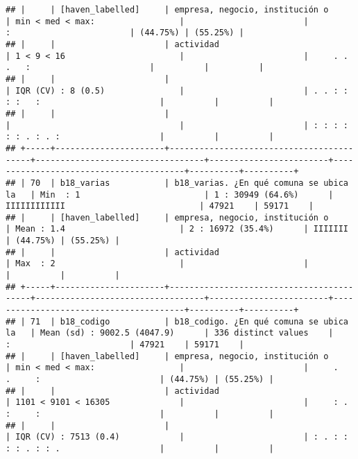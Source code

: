 \documentclass[]{article}
\begin{document}
\begin{verbatim}
## |     | [haven_labelled]     | empresa, negocio, institución o          | min < med < max:                 |                        |               :                        | (44.75%) | (55.25%) |
## |     |                      | actividad                                | 1 < 9 < 16                       |                        |     . .   .   :                        |          |          |
## |     |                      |                                          | IQR (CV) : 8 (0.5)               |                        | . . : : : :   :                        |          |          |
## |     |                      |                                          |                                  |                        | : : : : : : . : . :                    |          |          |
## +-----+----------------------+------------------------------------------+----------------------------------+------------------------+----------------------------------------+----------+----------+
## | 70  | b18_varias           | b18_varias. ¿En qué comuna se ubica la   | Min  : 1                         | 1 : 30949 (64.6%)      | IIIIIIIIIIII                           | 47921    | 59171    |
## |     | [haven_labelled]     | empresa, negocio, institución o          | Mean : 1.4                       | 2 : 16972 (35.4%)      | IIIIIII                                | (44.75%) | (55.25%) |
## |     |                      | actividad                                | Max  : 2                         |                        |                                        |          |          |
## +-----+----------------------+------------------------------------------+----------------------------------+------------------------+----------------------------------------+----------+----------+
## | 71  | b18_codigo           | b18_codigo. ¿En qué comuna se ubica la   | Mean (sd) : 9002.5 (4047.9)      | 336 distinct values    |               :                        | 47921    | 59171    |
## |     | [haven_labelled]     | empresa, negocio, institución o          | min < med < max:                 |                        |     .   .     :                        | (44.75%) | (55.25%) |
## |     |                      | actividad                                | 1101 < 9101 < 16305              |                        |     : . :     :                        |          |          |
## |     |                      |                                          | IQR (CV) : 7513 (0.4)            |                        | : . : : : : . : : .                    |          |          |

\end{verbatim}
\end{document}
